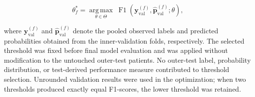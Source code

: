 \documentclass[pdflatex,sn-mathphys-num]{sn-jnl}%
\theoremstyle{thmstyleone}%
\theoremstyle{thmstyletwo}%
\theoremstyle{thmstylethree}%
\begin{document}
\begin{equation}
\theta_f^{*}
=
\underset{\theta\in\Theta}{\operatorname{arg\,max}}
\;
\operatorname{F1}
\left(
\mathbf{y}_{\mathrm{val}}^{(f)},
\widehat{\mathbf{p}}_{\mathrm{val}}^{(f)};
\theta
\right),
\label{eq:validation_threshold_selection}
\end{equation}

where \(\mathbf{y}_{\mathrm{val}}^{(f)}\) and
\(\widehat{\mathbf{p}}_{\mathrm{val}}^{(f)}\) denote the pooled observed labels
and predicted probabilities obtained from the inner-validation folds,
respectively. The selected threshold was fixed before final model evaluation
and was applied without modification to the untouched outer-test patients.
No outer-test label, probability distribution, or test-derived performance
measure contributed to threshold selection. Unrounded validation results were
used in the optimization; when two thresholds produced exactly equal
F1-scores, the lower threshold was retained.
\end{document}
